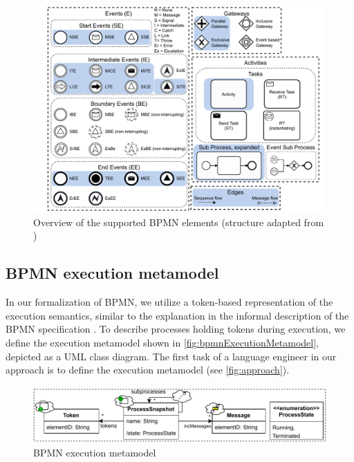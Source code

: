 \documentclass{lmcs} %
\begin{document}
\begin{figure}[ht]
    \centering
    \includegraphics[width=0.99\textwidth]{images/bpmn_semantics-elements-overview.pdf}
    \caption{Overview of the supported BPMN elements (structure adapted from \cite{houhouFirstOrderLogicVerification2022})}
    \label{fig:bpmnelementsOverview}
\end{figure}


\subsection{BPMN execution metamodel}

In our formalization of BPMN, we utilize a token-based representation of the execution semantics, similar to the explanation in the informal description of the BPMN specification \cite{objectmanagementgroupBusinessProcessModel2013}.
To describe processes holding tokens during execution, we define the execution metamodel shown in \autoref{fig:bpmnExecutionMetamodel}, depicted as a UML class diagram.
The first task of a language engineer in our approach is to define the execution metamodel (see \autoref{fig:approach}).

\begin{figure}[ht]
  \centering
  \includegraphics[width=1\linewidth]{images/bpmn_semantics-typegraph.pdf}
  \caption{BPMN execution metamodel}
  \label{fig:bpmnExecutionMetamodel}
\end{figure}
\end{document}
